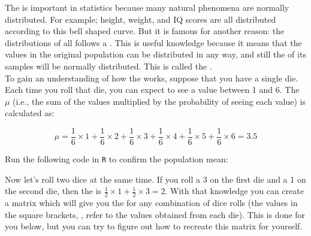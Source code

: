 \setcounter{chapter}{1}
\setcounter{section}{4}
\setcounter{question}{0}



The  is important in statistics because many natural phenomena are normally distributed. For example; height, weight, and IQ scores are all distributed according to this bell shaped curve. But it is famous for another reason: the distributions of all  follows a . This is useful knowledge because it means that the values in the original population can be distributed in any way, and still the  of its samples will be normally distributed. This is called the .\\

To gain an understanding of how the  works, suppose that you have a single die. Each time you roll that die, you can expect to see a value between 1 and 6. The  $\mu$ (i.e., the sum of the values multiplied by the probability of seeing each value) is calculated as:

\begin{equation*}
    \mu = \frac{1}{6} \times 1 + \frac{1}{6} \times 2 + \frac{1}{6} \times 3 + \frac{1}{6} \times 4 + \frac{1}{6} \times 5 + \frac{1}{6} \times 6 = 3.5
\end{equation*}

Run the following code in \texttt{R} to confirm the population mean: \\


Now let's roll two dice at the same time. If you roll a 3 on the first die and a 1 on the second die, then the  is $\frac{1}{2} \times 1 + \frac{1}{2} \times 3 = 2$. With that knowledge you can create a matrix which will give you the  for any combination of dice rolls (the values in the square brackets, \rcode{[ ]}, refer to the values obtained from each die). This is done for you below, but you can try to figure out how to recreate this matrix for yourself. \\

